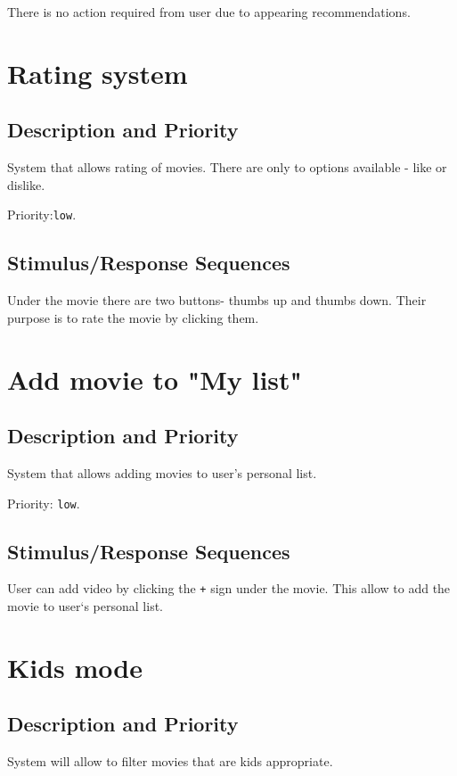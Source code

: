 \documentclass{scrreprt}
\begin{document}
There is no action required from user due to appearing recommendations.

\section{Rating system}
\subsection{Description and Priority}

System that allows rating of movies. There are only to options available - like or dislike.

Priority:\verb|low|.

\subsection{Stimulus/Response Sequences}

Under the movie there are two buttons- thumbs up and thumbs down. Their purpose is to rate the movie by clicking them.

\section {Add movie to "My list"}

\subsection{Description and Priority}

System that allows adding movies to user's personal list.

Priority: \verb|low|.

\subsection{Stimulus/Response Sequences}

User can add video by clicking the \verb|+| sign under the movie. This allow to add the movie to user`s personal list. 
\section{Kids mode}

\subsection{Description and Priority}

System will allow to filter movies that are kids appropriate.
\end{document}
